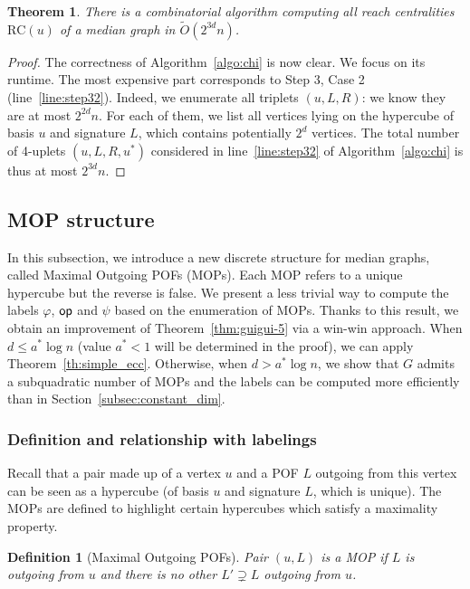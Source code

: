 \documentclass{article}
\newtheorem{theorem}{Theorem}
\newtheorem{definition}{Definition}
\newcommand{\opp}{\mbox{\textsf{op}}}
\newcommand{\rc}{\mbox{RC}}
\begin{document}
\begin{theorem}
There is a combinatorial algorithm computing all  reach centralities $\rc(u)$ of a median graph in $\tilde{O}(2^{3d}n)$.
\label{th:simple_rc}
\end{theorem}
\begin{proof}
The correctness of Algorithm~\ref{algo:chi} is now clear. We focus on its runtime. The most expensive part corresponds to Step 3, Case 2 (line~\ref{line:step32}). Indeed, we enumerate all triplets $(u,L,R)$: we know they are at most $2^{2d}n$. For each of them, we list all vertices lying on the hypercube of basis $u$ and signature $L$, which contains potentially $2^d$ vertices. The total number of 4-uplets $(u,L,R,u^*)$ considered in line~\ref{line:step32} of Algorithm~\ref{algo:chi} is thus at most $2^{3d}n$.
\end{proof}

\subsection{MOP structure} \label{subsec:mop}

In this subsection, we introduce a new discrete structure for median graphs, called Maximal Outgoing POFs (MOPs). Each MOP refers to a unique hypercube but the reverse is false. We present a less trivial way to compute the labels $\varphi$, $\opp$ and $\psi$ based on the enumeration of MOPs. Thanks to this result, we obtain an improvement of Theorem~\ref{thm:guigui-5} via a win-win approach. When $d \le a^*\log n$ (value $a^*<1$ will be determined in the proof), we can apply Theorem~\ref{th:simple_ecc}. Otherwise, when $d > a^* \log n$, we show that $G$ admits a subquadratic number of MOPs and the labels can be computed more efficiently than in Section~\ref{subsec:constant_dim}.

\subsubsection{Definition and relationship with labelings} \label{subsubsec:def_mop}

Recall that a pair made up of a vertex $u$ and a POF $L$ outgoing from this vertex can be seen as a hypercube (of basis $u$ and signature $L$, which is unique). The MOPs are defined to highlight certain hypercubes which satisfy a maximality property.

\begin{definition}[Maximal Outgoing POFs]
Pair $(u,L)$ is a MOP if $L$ is outgoing from $u$ and there is no other $L' \supsetneq L$ outgoing from $u$.
\label{def:mop}
\end{definition}
\end{document}
